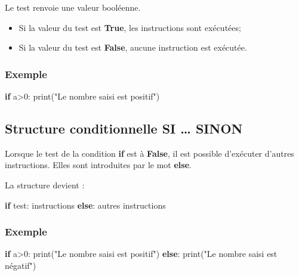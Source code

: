 \documentclass[11pt]{article}
\providecommand{\tightlist}{%
      \setlength{\itemsep}{0pt}\setlength{\parskip}{0pt}}
\newenvironment{Shaded}{}{}
\newcommand{\DecValTok}[1]{\textcolor[rgb]{0.25,0.63,0.44}{{#1}}}
\newcommand{\StringTok}[1]{\textcolor[rgb]{0.25,0.44,0.63}{{#1}}}
\newcommand{\NormalTok}[1]{{#1}}
\newcommand{\ControlFlowTok}[1]{\textcolor[rgb]{0.00,0.44,0.13}{\textbf{{#1}}}}
\newcommand{\OperatorTok}[1]{\textcolor[rgb]{0.40,0.40,0.40}{{#1}}}
\newcommand{\BuiltInTok}[1]{{#1}}
\begin{document}
Le test renvoie une valeur booléenne.

\begin{itemize}
\tightlist
\item
  Si la valeur du test est \textbf{True}, les instructions sont
  exécutées;
\item
  Si la valeur du test est \textbf{False}, aucune instruction est
  exécutée.
\end{itemize}

\hypertarget{exemple-1}{%
\subsubsection*{Exemple}\label{exemple-1}}

\begin{Shaded}
\begin{Highlighting}[]
\ControlFlowTok{if}\NormalTok{ a}\OperatorTok{\textgreater{}}\DecValTok{0}\NormalTok{:}
    \BuiltInTok{print}\NormalTok{(}\StringTok{"Le nombre saisi est positif"}\NormalTok{)}
\end{Highlighting}
\end{Shaded}

\hypertarget{structure-conditionnelle-si-sinon}{%
\subsection{Structure conditionnelle SI \ldots{}
SINON}\label{structure-conditionnelle-si-sinon}}

Lorsque le test de la condition \textbf{if} est à \textbf{False}, il est
possible d'exécuter d'autres instructions. Elles sont introduites par le
mot \textbf{else}.

La structure devient :

\begin{Shaded}
\begin{Highlighting}[]
\ControlFlowTok{if}\NormalTok{ test:}
\NormalTok{    instructions}
\ControlFlowTok{else}\NormalTok{:}
\NormalTok{    autres instructions}
\end{Highlighting}
\end{Shaded}

\hypertarget{exemple-2}{%
\subsubsection*{Exemple}\label{exemple-2}}

\begin{Shaded}
\begin{Highlighting}[]
\ControlFlowTok{if}\NormalTok{ a}\OperatorTok{\textgreater{}}\DecValTok{0}\NormalTok{:}
    \BuiltInTok{print}\NormalTok{(}\StringTok{"Le nombre saisi est positif"}\NormalTok{)}
\ControlFlowTok{else}\NormalTok{:}
    \BuiltInTok{print}\NormalTok{(}\StringTok{"Le nombre saisi est négatif"}\NormalTok{)}
\end{Highlighting}
\end{Shaded}
\end{document}
